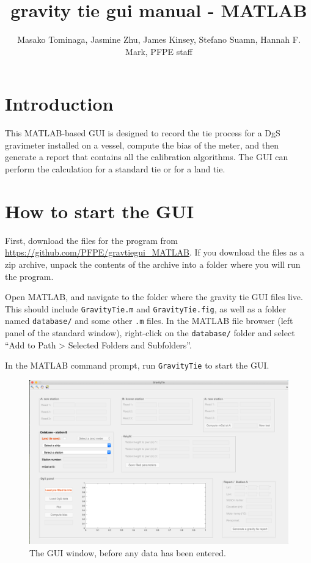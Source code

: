 \documentclass{pfpe-manual}
\title{gravity tie gui manual - MATLAB}
\author{Masako Tominaga, Jasmine Zhu, James Kinsey, Stefano Suamn, Hannah F. Mark, PFPE staff}
\begin{document}
\maketitle

\tableofcontents
\newpage

\section{Introduction}

This MATLAB-based GUI is designed to record the tie process for a DgS gravimeter installed on a vessel, compute the bias of the meter, and then generate a report that contains all the calibration algorithms. The GUI can perform the calculation for a standard tie or for a land tie.

\section{How to start the GUI}
\label{start}

First, download the files for the program from \url{https://github.com/PFPE/gravtiegui_MATLAB}. If you download the files as a zip archive, unpack the contents of the archive into a folder where you will run the program.

Open MATLAB, and navigate to the folder where the gravity tie GUI files live. This should include \texttt{GravityTie.m} and \texttt{GravityTie.fig}, as well as a folder named \texttt{database/} and some other \texttt{.m} files. In the MATLAB file browser (left panel of the standard window), right-click on the \texttt{database/} folder and select ``Add to Path > Selected Folders and Subfolders''.

In the MATLAB command prompt, run \texttt{GravityTie} to start the GUI.

\begin{figure}[ht!]
\centering
\includegraphics[width=\textwidth]{figs/GUI_window.png}
\caption{The GUI window, before any data has been entered.}
\label{guiwindow}
\end{figure}
\end{document}
